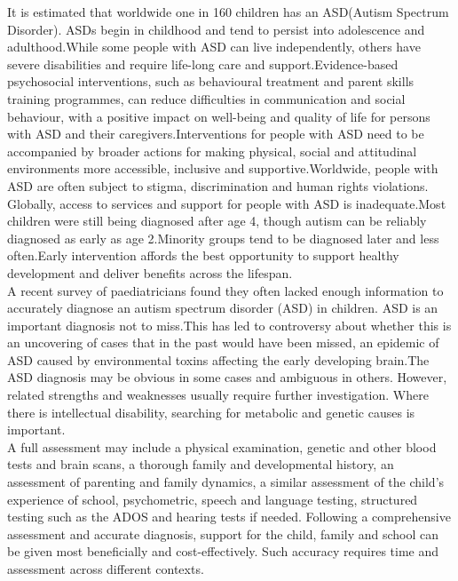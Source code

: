 It is estimated that worldwide one in 160 children has an ASD(Autism Spectrum Disorder). ASDs begin in childhood and tend to persist into adolescence and adulthood.While some people with ASD can live independently, others have severe disabilities and require life-long care and support.Evidence-based psychosocial interventions, such as behavioural treatment and parent skills training programmes, can reduce difficulties in communication and social behaviour, with a positive impact on well-being and quality of life for persons with ASD and their caregivers.Interventions for people with ASD need to be accompanied by broader actions for making physical, social and attitudinal environments more accessible, inclusive and supportive.Worldwide, people with ASD are often subject to stigma, discrimination and human rights violations. Globally, access to services and support for people with ASD is inadequate.Most children were still being diagnosed after age 4, though autism can be reliably diagnosed as early as age 2.Minority groups tend to be diagnosed later and less often.Early intervention affords the best opportunity to support healthy development and deliver benefits across the lifespan.\\
A recent survey of paediatricians found they often lacked enough information to accurately diagnose an autism spectrum disorder (ASD) in children. ASD is an important diagnosis not to miss.This has led to controversy about whether this is an uncovering of cases that in the past would have been missed, an epidemic of ASD caused by environmental toxins affecting the early developing brain.The ASD diagnosis may be obvious in some cases and ambiguous in others. However, related strengths and weaknesses usually require further investigation. Where there is intellectual disability, searching for metabolic and genetic causes is important.\\
A full assessment may include a physical examination, genetic and other blood tests and brain scans, a thorough family and developmental history, an assessment of parenting and family dynamics, a similar assessment of the child’s experience of school, psychometric, speech and language testing, structured testing such as the ADOS and hearing tests if needed.
Following a comprehensive assessment and accurate diagnosis, support for the child, family and school can be given most beneficially and cost-effectively. Such accuracy requires time and assessment across different contexts.



